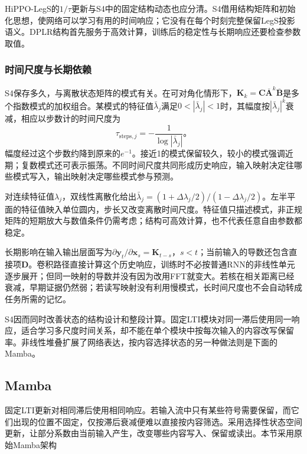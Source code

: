 HiPPO-LegS的$1/\tau$更新与S4中的固定结构动态也应分清。S4借用结构矩阵和初始化思想，使网络可以学习有用的时间响应；它没有在每个时刻完整保留LegS投影语义。DPLR结构首先服务于高效计算，训练后的稳定性与长期响应还要检查参数取值。

\subsubsection{时间尺度与长期依赖}
\label{sec:rnn-s4-long-memory}

S4保存多久，与离散状态矩阵的模式有关。在可对角化情形下，$\bm K_k=\bm C\overline{\bm A}^k\overline{\bm B}$是多个指数模式的加权组合。某模式的特征值$\bar\lambda_j$满足$0<|\bar\lambda_j|<1$时，其幅度按$|\bar\lambda_j|^k$衰减，相应以步数计的时间尺度为
\begin{equation}
  \tau_{\mathrm{steps},j}=-\frac{1}{\log|\bar\lambda_j|}\text{。}
  \label{eq:rnn-s4-timescale}
\end{equation}
幅度经过这个步数约降到原来的$e^{-1}$。接近1的模式保留较久，较小的模式强调近期；复数模式还可表示振荡。不同时间尺度共同形成历史响应，输入映射决定往哪些模式写入，输出映射决定哪些模式参与预测。

对连续特征值$\lambda_j$，双线性离散化给出$\bar\lambda_j=(1+\Delta\lambda_j/2)/(1-\Delta\lambda_j/2)$。左半平面的特征值映入单位圆内，步长又改变离散时间尺度。特征值只描述模式，非正规矩阵的短期放大与数值条件仍需考虑；结构可高效计算，也不代表任意自由参数都稳定。

长期影响在输入输出层面写为$\partial\bm y_t/\partial\bm x_s=\bm K_{t-s}$，$s<t$；当前输入的导数还包含直接项$\bm D$。卷积路径直接计算这个历史响应，训练时不必按普通RNN的非线性单元逐步展开；但同一映射的导数并没有因为改用FFT就变大。若核在相关距离已经衰减，早期证据仍然弱；若读写映射没有利用慢模式，长时间尺度也不会自动转成任务所需的记忆。

S4因而同时改善状态的结构设计和整段计算。固定LTI模块对同一滞后使用同一响应，适合学习多尺度时间关系，却不能在单个模块中按每次输入的内容改写保留率。非线性堆叠扩展了网络表达，按内容选择状态的另一种做法则是下面的Mamba。

\subsection{Mamba}
\label{sec:rnn-mamba}

固定LTI更新对相同滞后使用相同响应。若输入流中只有某些符号需要保留，而它们出现的位置不固定，仅按滞后衰减便难以直接按内容筛选。采用选择性状态空间更新，让部分系数由当前输入产生，改变哪些内容写入、保留或读出。本节采用原始Mamba架构

